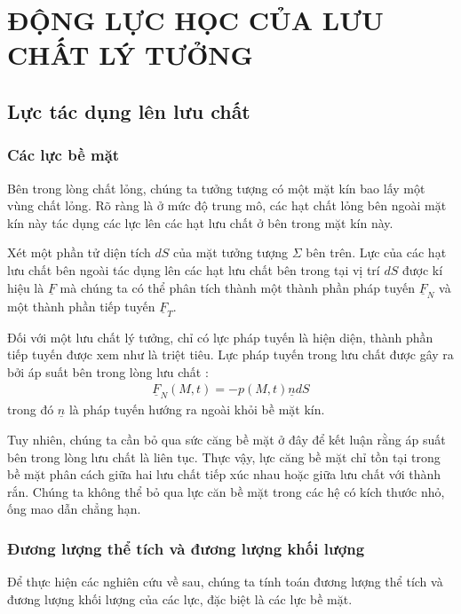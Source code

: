 \documentclass[CO_LUU_CHAT.tex]{subfiles}
\begin{document}
\chapter{ĐỘNG LỰC HỌC CỦA LƯU CHẤT LÝ TƯỞNG}

\newpage
\section{Lực tác dụng lên lưu chất}
\subsection{Các lực bề mặt}

	Bên trong lòng chất lỏng, chúng ta tưởng tượng có một mặt kín bao lấy một vùng chất lỏng. Rõ ràng là ở mức độ trung mô, các hạt chất lỏng bên ngoài mặt kín này tác dụng các lực lên các hạt lưu chất ở bên trong mặt kín này.

	Xét một phần tử diện tích $dS$ của mặt tưởng tượng $\Sigma$ bên trên. Lực của các hạt lưu chất bên ngoài tác dụng lên các hạt lưu chất bên trong tại vị trí $dS$ được kí hiệu là $\underline{F}$ mà chúng ta có thể phân tích thành một thành phần pháp tuyến $\underline{F}_N$ và một thành phần tiếp tuyến $\underline{F}_T$.

	Đối với một lưu chất lý tưởng, chỉ có lực pháp tuyến là hiện diện, thành phần tiếp tuyến được xem như là triệt tiêu. Lực pháp tuyến trong lưu chất được gây ra bởi áp suất bên trong lòng lưu chất :
		\begin{equation}
			\begin{aligned}
				\underline{F}_N(M,t)=-p(M,t)\underline{n}dS
			\end{aligned}
		\end{equation}
	trong đó $\underline{n}$ là pháp tuyến hướng ra ngoài khỏi bề mặt kín.

	Tuy nhiên, chúng ta cần bỏ qua sức căng bề mặt ở đây để kết luận rằng áp suất bên trong lòng lưu chất là liên tục. Thực vậy, lực căng bề mặt chỉ tồn tại trong bề mặt phân cách giữa hai lưu chất tiếp xúc nhau hoặc giữa lưu chất với thành rắn. Chúng ta không thể bỏ qua lực căn bề mặt trong các hệ có kích thước nhỏ, ống mao dẫn chẳng hạn.
	
\subsection{Đương lượng thể tích và đương lượng khối lượng}

	Để thực hiện các nghiên cứu về sau, chúng ta tính toán đương lượng thể tích và đương lượng khối lượng của các lực, đặc biệt là các lực bề mặt.
\end{document}
